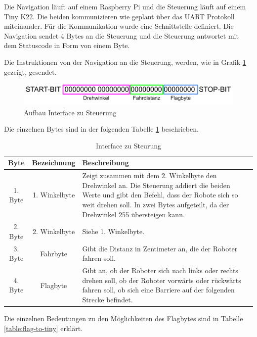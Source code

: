 Die Navigation läuft auf einem Raspberry Pi und die Steuerung läuft auf einem Tiny K22. Die beiden kommunizieren wie geplant über das UART Protokoll miteinander. Für die Kommunikation wurde eine Schnittstelle definiert. Die Navigation sendet 4 Bytes an die Steuerung und die Steuerung antwortet mit dem Statuscode in Form von einem Byte.

Die Instruktionen von der Navigation an die Steuerung, werden, wie in Grafik \ref{fig:interface-tiny} gezeigt, gesendet.

\begin{figure}[H]
\centering
\includegraphics[width=\textwidth]{assets/IT/interface-tiny.png}
\caption{Aufbau Interface zu Steuerung}
\label{fig:interface-tiny}
\end{figure}

Die einzelnen Bytes sind in der folgenden Tabelle \ref{table:interface-to-tiny} beschrieben.

\begin{table}[H]
\centering
\small
\begin{tabularx}{\textwidth}{|c|c|X|}
\hline
  \textbf{Byte} &\textbf{Bezeichnung} & \textbf{Beschreibung}\\
  \hline
      1. Byte&1. Winkelbyte &Zeigt zusammen mit dem 2. Winkelbyte den Drehwinkel an. Die Steuerung addiert die beiden Werte und gibt den Befehl, dass der Robote sich so weit drehen soll. In zwei Bytes aufgeteilt, da der Drehwinkel 255 übersteigen kann.\\
  \hline
2. Byte&2. Winkelbyte&Siehe 1. Winkelbyte.\\
  \hline
  3. Byte&Fahrbyte&Gibt die Distanz in Zentimeter an, die der Roboter fahren soll.\\
  \hline
  4. Byte&Flagbyte&Gibt an, ob der Roboter sich nach links oder rechts drehen soll, ob der Roboter vorwärts oder rückwärts fahren soll, ob sich eine Barriere auf der folgenden Strecke befindet.\\
  \hline
  \end{tabularx}
\caption{Interface zu Steurung}
\label{table:interface-to-tiny}
\end{table}

Die einzelnen Bedeutungen zu den Möglichkeiten des Flagbytes sind in Tabelle \ref{table:flag-to-tiny} erklärt.

